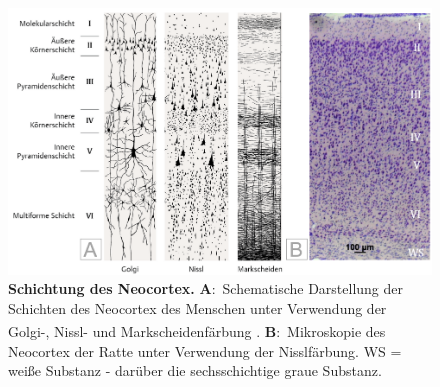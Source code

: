 \documentclass[12pt,a4paper,pdftex]{article}
\begin{document}
\begin{figure}[H]
	\centering
	\includegraphics[width=\textwidth]{pictures/Bilder_Jule/Andere/neocortex_schichtung.png}
	\caption[Schichtung des Neocortex]{\textbf{Schichtung des Neocortex.} \textbf{A}:~Schematische Darstellung der Schichten des Neocortex des Menschen unter Verwendung der Golgi-, Nissl- und Markscheidenfärbung \textsuperscript{\cite{taschenbuch_histologie}}. \textbf{B}:~Mikroskopie des Neocortex der Ratte unter Verwendung der Nisslfärbung. WS = weiße Substanz - darüber die sechsschichtige graue Substanz.}
	\label{fig:neoccortex_schichtung}
\end{figure}
\end{document}
